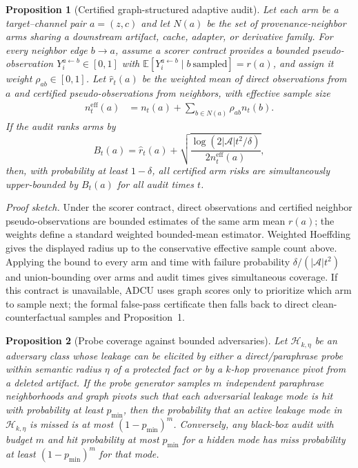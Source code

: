 \documentclass[10pt,journal,compsoc]{IEEEtran}
\newtheorem{proposition}{Proposition}
\newcommand{\method}{ADCU}
\begin{document}
\begin{proposition}[Certified graph-structured adaptive audit]
Let each arm be a target--channel pair $a=(z,c)$ and let $N(a)$ be the set of provenance-neighbor arms sharing a downstream artifact, cache, adapter, or derivative family. For every neighbor edge $b\to a$, assume a scorer contract provides a bounded pseudo-observation $Y_i^{a\leftarrow b}\in[0,1]$ with $\mathbb{E}[Y_i^{a\leftarrow b}\mid b\ \mathrm{sampled}]=r(a)$, and assign it weight $\rho_{ab}\in[0,1]$. Let $\hat r_t(a)$ be the weighted mean of direct observations from $a$ and certified pseudo-observations from neighbors, with effective sample size
\begin{align}
n_t^{\mathrm{eff}}(a)&=n_t(a)+
\sum_{b\in N(a)}\rho_{ab}n_t(b). \nonumber
\end{align}
If the audit ranks arms by
\[
B_t(a)=\hat r_t(a)+
\sqrt{\frac{\log(2|\mathcal{A}|t^2/\delta)}
{2 n_t^{\mathrm{eff}}(a)}} ,
\]
then, with probability at least $1-\delta$, all certified arm risks are simultaneously upper-bounded by $B_t(a)$ for all audit times $t$.
\end{proposition}

\textit{Proof sketch.}
Under the scorer contract, direct observations and certified neighbor pseudo-observations are bounded estimates of the same arm mean $r(a)$; the weights define a standard weighted bounded-mean estimator. Weighted Hoeffding gives the displayed radius up to the conservative effective sample count above. Applying the bound to every arm and time with failure probability $\delta/(|\mathcal{A}|t^2)$ and union-bounding over arms and audit times gives simultaneous coverage. If this contract is unavailable, \method{} uses graph scores only to prioritize which arm to sample next; the formal false-pass certificate then falls back to direct clean-counterfactual samples and Proposition~1.

\begin{proposition}[Probe coverage against bounded adversaries]
Let $\mathcal{H}_{k,\eta}$ be an adversary class whose leakage can be elicited by either a direct/paraphrase probe within semantic radius $\eta$ of a protected fact or by a $k$-hop provenance pivot from a deleted artifact. If the probe generator samples $m$ independent paraphrase neighborhoods and graph pivots such that each adversarial leakage mode is hit with probability at least $p_{\min}$, then the probability that an active leakage mode in $\mathcal{H}_{k,\eta}$ is missed is at most $(1-p_{\min})^m$. Conversely, any black-box audit with budget $m$ and hit probability at most $p_{\min}$ for a hidden mode has miss probability at least $(1-p_{\min})^m$ for that mode.
\end{proposition}
\end{document}
